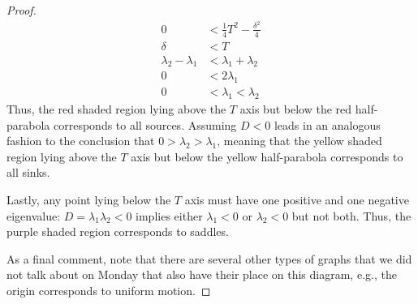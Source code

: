 \documentclass[../psets.tex]{subfiles}
\begin{document}
\begin{enumerate}
\begin{enumerate}
\begin{proof}
\begin{align*}
                0 &< \frac{1}{4}T^2-\frac{\delta^2}{4}\\
                \delta &< T\\
                \lambda_2-\lambda_1 &< \lambda_1+\lambda_2\\
                0 &< 2\lambda_1\\
                0 &< \lambda_1 < \lambda_2
            \end{align*}
            Thus, the red shaded region lying above the $T$ axis but below the red half-parabola corresponds to all sources. Assuming $D<0$ leads in an analogous fashion to the conclusion that $0>\lambda_2>\lambda_1$, meaning that the yellow shaded region lying above the $T$ axis but below the yellow half-parabola corresponds to all sinks.\par
            Lastly, any point lying below the $T$ axis must have one positive and one negative eigenvalue: $D=\lambda_1\lambda_2<0$ implies either $\lambda_1<0$ or $\lambda_2<0$ but not both. Thus, the purple shaded region corresponds to saddles.\par
            As a final comment, note that there are several other types of graphs that we did not talk about on Monday that also have their place on this diagram, e.g., the origin corresponds to uniform motion.
        \end{proof}
    \end{enumerate}
\end{enumerate}
\end{document}
